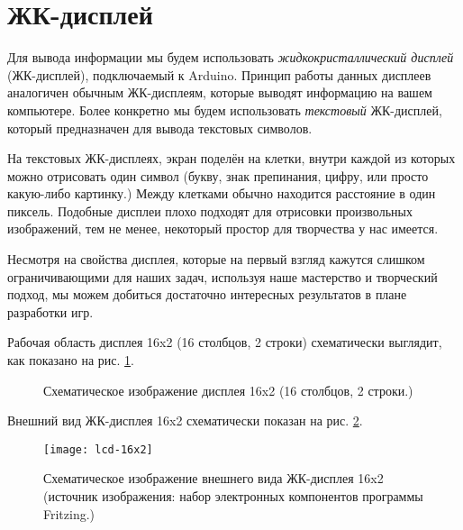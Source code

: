 \documentclass[../sparc.tex]{subfiles}
\begin{document}
\section{ЖК-дисплей}

Для вывода информации мы будем использовать \emph{жидкокристаллический дисплей}
(ЖК-дисплей), подключаемый к Arduino.  Принцип работы данных дисплеев аналогичен
обычным ЖК-дисплеям, которые выводят информацию на вашем компьютере.  Более
конкретно мы будем использовать \emph{текстовый} ЖК-дисплей, который
предназначен для вывода текстовых символов.

На текстовых ЖК-дисплеях, экран поделён на клетки, внутри каждой из которых
можно отрисовать один символ (букву, знак препинания, цифру, или просто
какую-либо картинку.)  Между клетками обычно находится расстояние в один
пиксель.  Подобные дисплеи плохо подходят для отрисовки произвольных
изображений, тем не менее, некоторый простор для творчества у нас имеется.

Несмотря на свойства дисплея, которые на первый взгляд кажутся слишком
ограничивающими для наших задач, используя наше мастерство и творческий подход,
мы можем добиться достаточно интересных результатов в плане разработки игр.

Рабочая область дисплея 16x2 (16 столбцов, 2 строки) схематически выглядит, как
показано на рис. \ref{fig:lcd-16x2-schematics}.

\begin{figure}[ht]
  \centering
  \caption{Схематическое изображение дисплея 16x2 (16 столбцов, 2 строки.)}
  \label{fig:lcd-16x2-schematics}
\end{figure}

Внешний вид ЖК-дисплея 16x2 схематически показан на рис. \ref{fig:lcd-16x2}.

\begin{figure}[h]
  \centering
  \texttt{[image: lcd-16x2]}
  \caption{Схематическое изображение внешнего вида ЖК-дисплея 16x2 (источник
    изображения: набор электронных компонентов программы Fritzing.)}
  \label{fig:lcd-16x2}
\end{figure}
\end{document}
